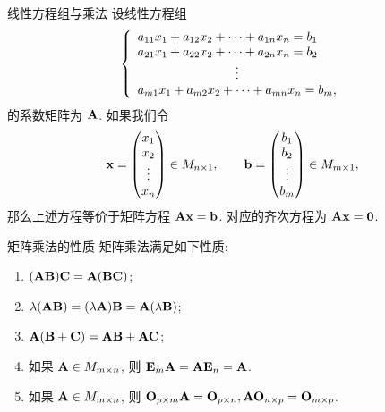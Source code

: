 \begin{frame}{线性方程组与乘法}
	\onslide<+->
	设线性方程组
	\[\laeq{
		a_{11}x_1+a_{12}x_2+\cdots+a_{1n}x_n=b_1\\
		a_{21}x_1+a_{22}x_2+\cdots+a_{2n}x_n=b_2\\
		\vvdots\\
		a_{m1}x_1+a_{m2}x_2+\cdots+a_{mn}x_n=b_m,
	}\]
	的系数矩阵为 ${\mathbf{A}}$.
	\onslide<+->
	如果我们令
	\[{\mathbf{x}}=\begin{pmatrix}
		x_1\\x_2\\\vdots\\x_n
	\end{pmatrix}\in M_{n\times 1},\qquad
	{\mathbf{b}}=\begin{pmatrix}
		b_1\\b_2\\\vdots\\b_m
	\end{pmatrix}\in M_{m\times 1},\]
	\onslide<+->
	那么上述方程等价于矩阵方程 \alert{${\mathbf{A}}{\mathbf{x}}={\mathbf{b}}$}.
	\onslide<+->
	对应的齐次方程为 \alert{${\mathbf{A}}{\mathbf{x}}={\bf0}$}.
\end{frame}


\begin{frame}{矩阵乘法的性质}
	\onslide<+->
	矩阵乘法满足如下性质:
	\begin{enumerate}
		\item $({\mathbf{A}}{\mathbf{B}}){\mathbf{C}}={\mathbf{A}}({\mathbf{B}}{\mathbf{C}})$;
		\item $\lambda({\mathbf{A}}{\mathbf{B}})=(\lambda{\mathbf{A}}){\mathbf{B}}={\mathbf{A}}(\lambda{\mathbf{B}})$;
		\item ${\mathbf{A}}({\mathbf{B}}+{\mathbf{C}})={\mathbf{A}}{\mathbf{B}}+{\mathbf{A}}{\mathbf{C}}$;
		\item 如果 ${\mathbf{A}}\in M_{m\times n}$, 则 ${\mathbf{E}}_m {\mathbf{A}}={\mathbf{A}}{\mathbf{E}}_n={\mathbf{A}}$.
		\item 如果 ${\mathbf{A}}\in M_{m\times n}$, 则 ${\mathbf{O}}_{p\times m} {\mathbf{A}}={\mathbf{O}}_{p\times n}, {\mathbf{A}}{\mathbf{O}}_{n\times p}={\mathbf{O}}_{m\times p}$.
	\end{enumerate}
\end{frame}


